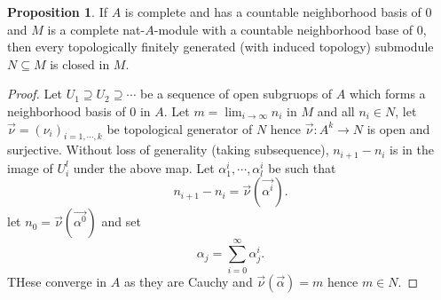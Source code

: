 \documentclass[10pt]{article}
\numberwithin{equation}{section}
\theoremstyle{definition}
\newtheorem{proposition}{Proposition}[subsection]
\begin{document}
\begin{proposition}
    If $A$ is complete and has a countable neighborhood basis of $0$ and $M$ is a complete nat-$A$-module with a countable neighborhood base of $0$, then every topologically finitely generated (with induced topology) submodule $N\subseteq M$ is closed in $M$.
\end{proposition}
\begin{proof}
    Let $U_1\supseteq U_2\supseteq\cdots$ be a sequence of open subgruops of $A$ which forms a neighborhood basis of $0$ in $A$. Let $m = \lim_{i\to\infty}n_i$ in $M$ and all $n_i\in N$, let $\vec{\nu} = (\nu_i)_{i=1,\cdots,k}$ be topological generator of $N$ hence $\vec{\nu}:A^k\to N$ is open and surjective. Without loss of generality (taking subsequence), $n_{i+1}-n_i$ is in the image of $U_i^l$ under the above map. Let $\alpha^i_1,\cdots,\alpha^i_l$ be such that 
    \begin{equation*}
        n_{i+1}-n_i = \vec{\nu}(\vec{\alpha^i}).
    \end{equation*}
    let $n_0 = \vec{\nu}(\vec{\alpha^0})$ and set 
    \begin{equation*}
        \alpha_ j =\sum_{i=0}^\infty \alpha^i_j.
    \end{equation*}
    THese converge in $A$ as they are Cauchy and $\vec{\nu}(\vec{\alpha}) = m$ hence $m\in N$.
\end{proof}
\end{document}
